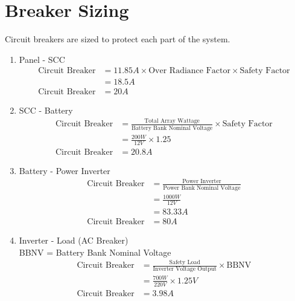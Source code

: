 \section*{Breaker Sizing}
Circuit breakers are sized to protect each part of the system.  
\begin{enumerate}[label=\alph*.]
	\item Panel - SCC
	\begin{align*}
		\text{Circuit Breaker} &= 11.85A \times \text{Over Radiance Factor} \times \text{Safety Factor} \\
		&= 18.5A \\
		\text{Circuit Breaker} &= 20A
	\end{align*}
	
	\item SCC - Battery
	\begin{align*}
		\text{Circuit Breaker} &= \frac{\text{Total Array Wattage}}{\text{Battery Bank Nominal Voltage}} \times \text{Safety Factor} \\
		&= \frac{200W}{12V} \times 1.25 \\
		\text{Circuit Breaker} &=20.8A
	\end{align*}
	
	\item Battery - Power Inverter
	\begin{align*}
		\text{Circuit Breaker} &= \frac{\text{Power Inverter}}{\text{Power Bank Nominal Voltage}} \\
		&= \frac{1000W}{12V}\\
		&= 83.33A\\
		\text{Circuit Breaker} &= 80A
	\end{align*}
	
	\item Inverter - Load (AC Breaker)\\
	BBNV = Battery Bank Nominal Voltage
	\begin{align*}
		\text{Circuit Breaker} &= \frac{\text{Safety Load}}{\text{Inverter Voltage Output}} \times \text{BBNV} \\
		&= \frac{700W}{220V} \times 1.25V \\
		\text{Circuit Breaker} &= 3.98A
	\end{align*}
\end{enumerate}


